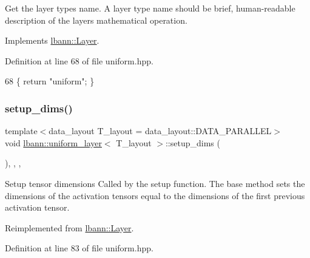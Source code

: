 Get the layer type\textquotesingle{}s name. A layer type name should be brief, human-\/readable description of the layer\textquotesingle{}s mathematical operation. 

Implements \hyperlink{classlbann_1_1Layer_a0fa0ea9160b490c151c0a17fde4f7239}{lbann\+::\+Layer}.



Definition at line 68 of file uniform.\+hpp.


\begin{DoxyCode}
68 \{ \textcolor{keywordflow}{return} \textcolor{stringliteral}{"uniform"}; \}
\end{DoxyCode}
\mbox{\label{classlbann_1_1uniform__layer_a60dfb64110369be8f9802c9e010cfbd1}} 
\subsubsection{\texorpdfstring{setup\+\_\+dims()}{setup\_dims()}}
{\footnotesize\ttfamily template$<$data\+\_\+layout T\+\_\+layout = data\+\_\+layout\+::\+D\+A\+T\+A\+\_\+\+P\+A\+R\+A\+L\+L\+EL$>$ \\
void \hyperlink{classlbann_1_1uniform__layer}{lbann\+::uniform\+\_\+layer}$<$ T\+\_\+layout $>$\+::setup\+\_\+dims (\begin{DoxyParamCaption}{ }\end{DoxyParamCaption})\hspace{0.3cm}{\ttfamily [inline]}, {\ttfamily [override]}, {\ttfamily [protected]}, {\ttfamily [virtual]}}

Setup tensor dimensions Called by the setup function. The base method sets the dimensions of the activation tensors equal to the dimensions of the first previous activation tensor. 

Reimplemented from \hyperlink{classlbann_1_1Layer_a90fce1b06c1f2abb480e18cfe08a9746}{lbann\+::\+Layer}.



Definition at line 83 of file uniform.\+hpp.



